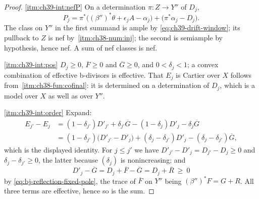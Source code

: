 \begin{proof}
\cref{itm:ch39-int:nefP}  On a determination $\pi:Z\to Y''$ of $D_j$,
\[
 P_j=\pi^*\bigl((\beta'')^*\theta+\epsilon_jA-\alpha_j\bigr)
      +\bigl(\pi^*\alpha_j-D_j\bigr).
\]
The class on $Y''$ in the first summand is ample by
\eqref{eq:ch39-drift-window}; its pullback to $Z$ is nef by
\,\cref{itm:ch38-num:inj}; the second is
semiample by hypothesis, hence nef.  A sum of nef classes is nef.

\cref{itm:ch39-int:pos}  $D_j\ge0$, $\overline F\ge0$ and
$\overline G\ge0$, and $0<\delta_j<1$; a convex combination of
effective b-divisors is effective.  That $E_j$ is Cartier over $X$
follows from
\,\cref{itm:ch38-fun:cofinal}: it is
determined on a determination of $D_j$, which is a model over $X$ as
well as over $Y''$.

\cref{itm:ch39-int:order}  Expand:
\[
 \begin{aligned}
 E_{j'}-E_j
 &=(1-\delta_{j'})D'_{j'}+\delta_{j'}\overline G
  -(1-\delta_j)D'_j-\delta_j\overline G\\
 &=(1-\delta_{j'})\bigl(D'_{j'}-D'_j\bigr)
  +(\delta_j-\delta_{j'})D'_j
  -(\delta_j-\delta_{j'})\overline G,
 \end{aligned}
\]
which is the displayed identity.  For $j\le j'$ we have
$D'_{j'}-D'_j=D_{j'}-D_j\ge0$ and
$\delta_j-\delta_{j'}\ge0$, the latter because $(\delta_j)$ is
nonincreasing; and
\[
 D'_j-\overline G=D_j+\overline F-\overline G
 =D_j+\overline R\ \ge\ 0
\]
by \eqref{eq:bj-reflection-fixed-pole}, the trace of $\overline F$ on
$Y''$ being $(\beta'')^*F=G+R$.  All three terms are effective, hence so
is the sum.


\end{proof}
